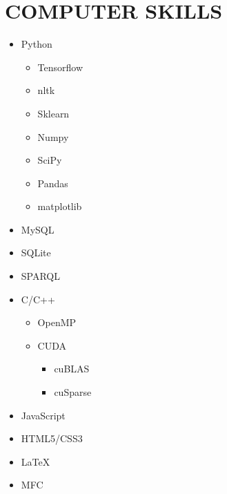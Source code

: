 \section{COMPUTER SKILLS}

\begin{cvcolumns}
	{
		\vspace{-2em}
		\begin{multicols}{2}
			\begin{itemize}
				\item Python
					\begin{itemize}
						\item Tensorflow
						\item nltk
						\item Sklearn
						\item Numpy
						\item SciPy
						\item Pandas
						\item matplotlib					\end{itemize}
				\item MySQL
				\item SQLite
				\item SPARQL
				\item C/C++ 
					\begin{itemize}
						\item OpenMP
						\item CUDA
						\begin{itemize}
							\item cuBLAS
							\item cuSparse
						\end{itemize}
					\end{itemize}
				\item JavaScript 
				\item HTML5/CSS3
				\item \LaTeX 
				\item MFC   
			\end{itemize}
		\end{multicols}
	}
	
	

\end{cvcolumns}
